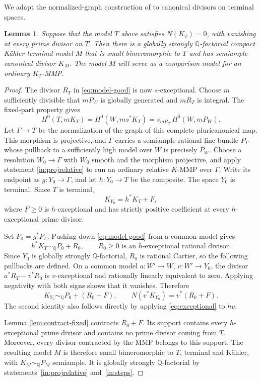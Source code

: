 \documentclass[11pt,a4paper]{article}
\newtheorem{lemma}[theorem]{Lemma}
\theoremstyle{definition}\newtheorem{definition}[theorem]{Definition}
\theoremstyle{remark}\newtheorem*{remark}{Remark}
\newcommand{\Q}{\mathbb Q}\newcommand{\C}{\mathbb C}
\begin{document}
We adapt the normalized-graph construction of
\cite[Lemma~3.11]{OAI034} to canonical divisors on terminal spaces.

\begin{lemma}\label{lem:small-semiample}
Suppose that the model $T$ above satisfies $N(K_T)=0$, with vanishing at every
prime divisor on $T$. Then there is a globally strongly $\Q$-factorial
compact Kähler terminal model $M$ that is small bimeromorphic to $T$
and has semiample canonical divisor $K_M$.
The model $M$ will serve as a comparison model for an ordinary $K_T$-MMP.
\end{lemma}

\begin{proof}
The divisor $R_T$ in \eqref{eq:model-good} is now $s$-exceptional. Choose $m$
sufficiently divisible that $mP_W$ is globally generated and $mR_T$ is integral.
The fixed-part property gives
\[
 H^0(T,mK_T)=H^0(W,ms^*K_T)
 =s_{mR_T}\,H^0(W,mP_W).
\]
Let $\Gamma\to T$ be the normalization of the graph of this complete
pluricanonical map. This morphism is projective, and $\Gamma$ carries a
semiample rational line bundle $P_\Gamma$ whose pullback to a sufficiently high
model over $W$ is precisely $P_W$.
Choose a resolution $W_0\to\Gamma$ with $W_0$ smooth and the morphism
projective, and apply statement
\ref{in:projrelative} to run an ordinary relative $K$-MMP over $\Gamma$.
Write its endpoint as $g:Y_0\to\Gamma$, and let $h:Y_0\to T$ be the composite.
The space $Y_0$ is terminal. Since $T$ is terminal,
\[
 K_{Y_0}=h^*K_T+F,
\]
where $F\ge0$ is $h$-exceptional and has strictly positive coefficient at every
$h$-exceptional prime divisor.

Set $P_0=g^*P_\Gamma$. Pushing down \eqref{eq:model-good} from a common model
gives
\[
 h^*K_T\sim_\Q P_0+R_0,
 \qquad R_0\ge0\text{ is an }h\text{-exceptional rational divisor}.
\]
Since $Y_0$ is globally strongly $\Q$-factorial, $R_0$ is rational Cartier, so
the following pullbacks are defined. On a common model
$a:W'\to W$, $v:W'\to Y_0$, the divisor $a^*R_T-v^*R_0$ is $v$-exceptional
and rationally linearly equivalent to zero. Applying negativity with both
signs shows that it vanishes. Therefore
\[
 K_{Y_0}\sim_\Q P_0+(R_0+F),\qquad
 N(v^*K_{Y_0})=v^*(R_0+F).
\]
The second identity also follows directly by applying \eqref{eq:exceptional}
to $hv$.

Lemma \ref{lem:contract-fixed} contracts $R_0+F$. Its support contains every
$h$-exceptional prime divisor and contains no prime divisor coming from $T$.
Moreover, every divisor contracted by the MMP belongs to this support.
The resulting model $M$ is therefore small bimeromorphic to $T$, terminal and
Kähler, with $K_M\sim_\Q P_M$ semiample. It is globally strongly
$\Q$-factorial by statements~\ref{in:projrelative} and~\ref{in:steps}.
\end{proof}
\end{document}
